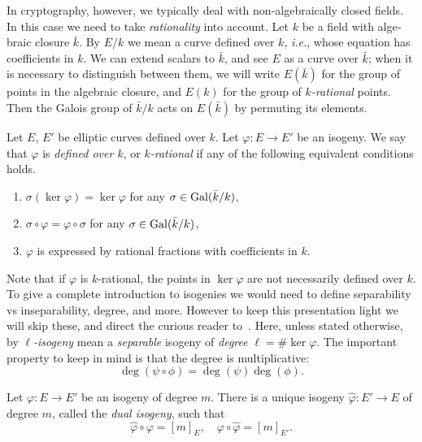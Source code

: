 \begin{otherlanguage}{english}
  In cryptography, however, we typically deal with non-algebraically
  closed fields. In this case we need to take \emph{rationality} into
  account. Let $k$ be a field with algebraic closure $\bar{k}$. By
  $E/k$ we mean a curve defined over $k$, \emph{i.e.}, whose equation
  has coefficients in $k$. We can extend scalars to $\bar{k}$, and see
  $E$ as a curve over $\bar{k}$; when it is necessary to distinguish
  between them, we will write $E(\bar{k})$ for the group of points in
  the algebraic closure, and $E(k)$ for the group of
  \emph{$k$-rational} points.  Then the Galois group of $\bar{k}/k$
  acts on $E(\bar{k})$ by permuting its elements.

  \begin{definition}
    Let $E$, $E'$ be elliptic curves defined over $k$. Let
    $\varphi:E\to E'$ be an isogeny. We say that $\varphi$ is
    \emph{defined over $k$}, or \emph{$k$-rational} if any of the
    following equivalent conditions holds.
    \begin{enumerate}
    \item $\sigma(\ker\varphi) = \ker\varphi$ for any
      $\sigma\in\mathrm{Gal}(\bar{k}/k)$,
    \item $\sigma\circ\varphi = \varphi\circ\sigma$ for any
      $\sigma\in\mathrm{Gal}(\bar{k}/k)$,
    \item $\varphi$ is expressed by rational fractions with
      coefficients in $k$.
    \end{enumerate}
  \end{definition}

  Note that if $\varphi$ is $k$-rational, the points in $\ker\varphi$
  are not necessarily defined over $k$. To give a complete
  introduction to isogenies we would need to define separability vs
  inseparability, degree, and more. However to keep this presentation
  light we will skip these, and direct the curious reader
  to~\cite{silverman:elliptic,milne2006,defeo2017isogenybased}.  Here,
  unless stated otherwise, by \emph{$\ell$-isogeny} mean a
  \emph{separable} isogeny of \emph{degree} $\ell=\#\ker\varphi$. The
  important property to keep in mind is that the degree is
  multiplicative:
  \[\deg(\psi\circ\phi) = \deg(\psi)\deg(\phi).\]

  \begin{theorem}
    Let $\varphi:E\to E'$ be an isogeny of degree $m$. %
    There is a unique isogeny $\hat{\varphi}:E'\to E$ of degree $m$,
    called the \emph{dual isogeny}, such that
    \[\hat{\varphi}\circ\varphi = [m]_E, \quad \varphi\circ\hat{\varphi} = [m]_{E'}.\] %
  \end{theorem}


\end{otherlanguage}
